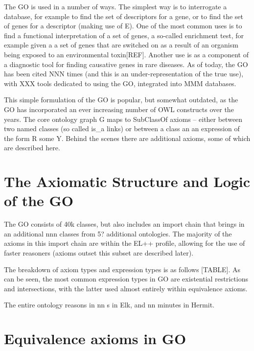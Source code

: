 \documentclass{llncs}
\begin{document}
The GO is used in a number of ways. The simplest way is to interrogate
a database, for example to find the set of descriptors for a gene, or
to find the set of genes for a descriptor (making use of E). One of
the most common uses is to find a functional interpretation of a set
of genes, a so-called enrichment test, for example given a a set of
genes that are switched on as a result of an organism being exposed to
an environmental toxin[REF]. Another use is as a component of a
diagnostic tool for finding causative genes in rare
diseases\cite{Phevor}. As of today, the GO has been cited NNN times
(and this is an under-representation of the true use), with XXX tools
dedicated to using the GO, integrated into MMM databases.

This simple formulation of the GO is popular, but somewhat outdated,  %
as the GO has incorporated an ever increasing number of OWL constructs
over the years. The core ontology graph G maps to SubClassOf axioms --
either between two named classes (so called is\_a links) or between a
class an an expression of the form R some Y. Behind the scenes there
are additional axioms, some of which are described here.

\section{The Axiomatic Structure and Logic of the GO}

The GO consists of 40k classes, but also includes an import chain that brings in an additional nnn classes from 5? additional ontologies. The majority of the axioms in this import chain are within the EL++ profile, allowing for the use of faster reasoners (axioms outset this subset are described later).

The breakdown of axiom types and expression types is as follows [TABLE]. As can be seen, the most common expression types in GO are existential restrictions and intersections, with the latter used almost entirely within equivalence axioms.

The entire ontology reasons in nn s in Elk\cite{Kazakov2014}, and nn minutes in Hermit.

\section{Equivalence axioms in GO}
\end{document}
